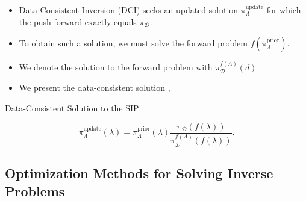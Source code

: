 \documentclass[11pt]{beamer}
\begin{document}
\begin{frame}

\begin{itemize}

	\item Data-Consistent Inversion (DCI) seeks an updated solution $\pi_\Lambda^\text{update}$ for which the push-forward exactly equals $\pi_\mathcal{D}$. 
	
	\item To obtain such a solution, we must solve the forward problem $f(\pi_\Lambda^\text{prior})$.
	
	\item We denote the solution to the forward problem with $\pi_\mathcal{D}^{f(\Lambda)}(d)$.




	\item We present the data-consistent solution \footnotemark[1],

\end{itemize}

\begin{block}{Data-Consistent Solution to the SIP}

\begin{equation} \label{eq:1}
\pi_\Lambda^\text{update}(\lambda)=\pi_\Lambda^\text{prior}(\lambda)\frac{\pi_\mathcal{D}(f(\lambda))}{\pi_\mathcal{D}^{f(\Lambda)}(f(\lambda))}.
\end{equation}

\end{block}


\end{frame}

\subsection{Optimization Methods for Solving Inverse Problems}
\end{document}
